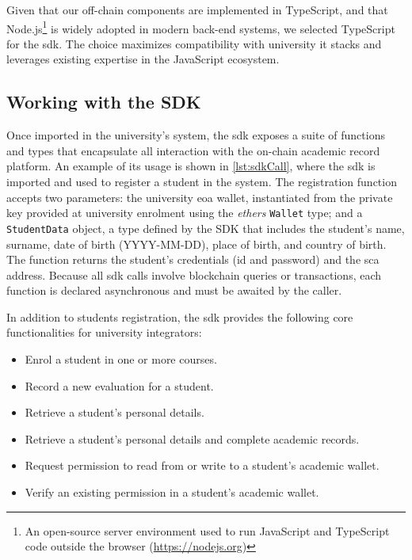 Given that our off-chain components are implemented in TypeScript, and that Node.js\footnote{An open-source server environment used to run JavaScript and TypeScript code outside the browser (\url{https://nodejs.org})} is widely adopted in modern back-end systems, we selected TypeScript for the \acrshort{sdk}. The choice maximizes compatibility with university \acrshort{it} stacks and leverages existing expertise in the JavaScript ecosystem.

\subsection{Working with the SDK}
Once imported in the university's system, the \acrshort{sdk} exposes a suite of functions and types that encapsulate all interaction with the on-chain academic record platform. An example of its usage is shown in \cref{lst:sdkCall}, where the \acrshort{sdk} is imported and used to register a student in the system. The registration function accepts two parameters: the university \acrshort{eoa} wallet, instantiated from the private key provided at university enrolment using the \textit{ethers} \texttt{Wallet} type; and a \texttt{StudentData} object, a type defined by the SDK that includes the student’s name, surname, date of birth (YYYY-MM-DD), place of birth, and country of birth. The function returns the student's credentials (\gls{id} and password) and the \acrshort{sca} address. Because all \acrshort{sdk} calls involve blockchain queries or transactions, each function is declared asynchronous and must be awaited by the caller.



In addition to students registration, the \acrshort{sdk} provides the following core functionalities for university integrators:
\begin{itemize}
    \item Enrol a student in one or more courses.
    \item Record a new evaluation for a student.
    \item Retrieve a student’s personal details.
    \item Retrieve a student’s personal details and complete academic records.
    \item Request permission to read from or write to a student’s academic wallet.
    \item Verify an existing permission in a student’s academic wallet.
\end{itemize}

